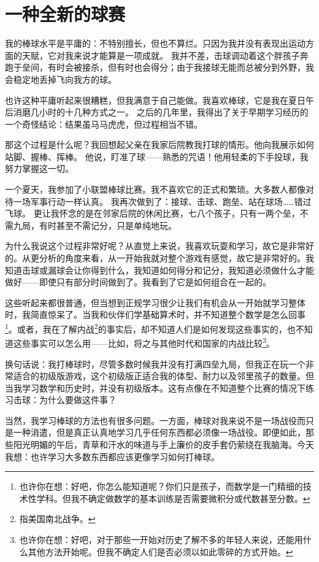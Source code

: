 \chapter{一种全新的球赛}

我的棒球水平是平庸的：不特别擅长，但也不算烂。只因为我并没有表现出运动方面的天赋，它对我来说才能算是一项成就。
我并不差，击球调动着这个胖孩子奔跑于垒间，有时会被接杀，但有时也会得分；由于我接球无能而总被分到外野，我会稳定地丢掉飞向我方的球。

也许这种平庸听起来很糟糕，但我满意于自己能做。我喜欢棒球，它是我在夏日午后消磨几小时的十几种方式之一。
之后的几年里，我得出了关于早期学习经历的一个奇怪结论：结果虽马马虎虎，但过程相当不错。

那这个过程是什么呢？我回想起父亲在我家后院教我打球的情形。他向我展示如何站脚、握棒、挥棒。
他说，盯准了球——熟悉的咒语！他用轻柔的下手投球，我努力掌握这一切。

一个夏天，我参加了小联盟棒球比赛。我不喜欢它的正式和繁琐。大多数人都像对待一场军事行动一样认真。
我再次做到了：接球、击球、跑垒、站在球场……错过飞球。
更让我怀念的是在邻家后院的休闲比赛，七八个孩子，只有一两个垒，不需九局，有时甚至不需记分，只是单纯地玩。

为什么我说这个过程非常好呢？从直觉上来说，我喜欢玩耍和学习，故它是非常好的。从更分析的角度来看，从一开始我就对整个游戏有感觉，故它是非常好的。我知道击球或漏球会让你得到什么，我知道如何得分和记分，我知道必须做什么才能做好——即使只有部分时间做到了。我看到了它是如何组合在一起的。

这些听起来都很普通，但当想到正规学习很少让我们有机会从一开始就学习整体时，我简直惊呆了。当我和伙伴们学基础算术时，并不知道整个数学是怎么回事\footnote{也许你在想：好吧，你怎么能知道呢？你们只是孩子，而数学是一门精细的技术性学科。但我不确定做数学的基本训练是否需要微积分或代数甚至分数。}。或者，我在了解内战\footnote{指美国南北战争。}的事实后，却不知道人们是如何发现这些事实的，也不知道这些事实可以怎么用——比如，将之与其他时代和国家的内战比较\footnote{也许你在想：好吧，对于那些一开始对历史了解不多的年轻人来说，还能用什么其他方法开始呢。但我不确定人们是否必须以如此零碎的方式开始。}。

换句话说：我打棒球时，尽管多数时候我并没有打满四垒九局，但我正在玩一个非常适合的初级版游戏，这个初级版正适合我的体型、耐力以及邻里孩子的数量。但当我学习数学和历史时，并没有初级版本。这有点像在不知道整个比赛的情况下练习击球：为什么要做这件事？

当然，我学习棒球的方法也有很多问题。一方面，棒球对我来说不是一场战役而只是一种消遣，但是真正认真地学习几乎任何东西都必须像一场战役。即便如此，那些阳光明媚的午后，青草和汗水的味道与手上廉价的皮手套仍萦绕在我脑海。今天我想：也许学习大多数东西都应该更像学习如何打棒球。


